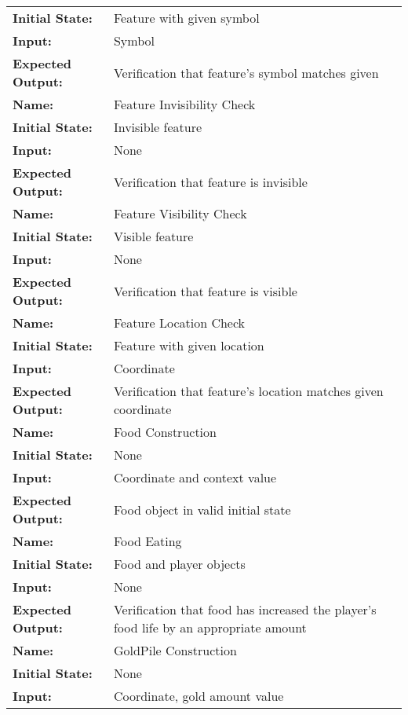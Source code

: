 \documentclass[12pt, titlepage]{article}
\begin{document}
\begin{center}
\begin{longtable}{ l | p{10cm} }
				\textbf{Initial State:} & Feature with given symbol\\
				\textbf{Input:} & Symbol\\
				\textbf{Expected Output:} & Verification that feature's symbol matches given\\[1em]
				\hline
				\rule{0pt}{2em}\textbf{Name:} & Feature Invisibility Check\\
				\textbf{Initial State:} & Invisible feature\\
				\textbf{Input:} & None\\
				\textbf{Expected Output:} & Verification that feature is invisible\\[1em]
				\hline
				\rule{0pt}{2em}\textbf{Name:} & Feature Visibility Check\\
				\textbf{Initial State:} & Visible feature\\
				\textbf{Input:} & None\\
				\textbf{Expected Output:} & Verification that feature is visible\\[1em]
				\hline
				\rule{0pt}{2em}\textbf{Name:} & Feature Location Check\\
				\textbf{Initial State:} & Feature with given location\\
				\textbf{Input:} & Coordinate\\
				\textbf{Expected Output:} & Verification that feature's location matches given coordinate\\[1em]
				\hline
				\rule{0pt}{2em}\textbf{Name:} & Food Construction\\
				\textbf{Initial State:} & None\\
				\textbf{Input:} & Coordinate and context value\\
				\textbf{Expected Output:} & Food object in valid initial state\\[1em]
				\hline
				\rule{0pt}{2em}\textbf{Name:} & Food Eating\\
				\textbf{Initial State:} & Food and player objects\\
				\textbf{Input:} & None\\
				\textbf{Expected Output:} & Verification that food has increased the player's food life by an appropriate amount\\[1em]
				\hline
				\rule{0pt}{2em}\textbf{Name:} & GoldPile Construction\\
				\textbf{Initial State:} & None\\
				\textbf{Input:} & Coordinate, gold amount value\\

\end{longtable}
\end{center}
\end{document}
